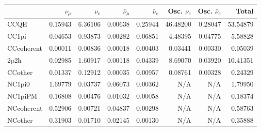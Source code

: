 

\begin{table}
	\centering
	\begin{tabular} { | l ||r | r | r | r | r | r | | r | }
	\hline
	              & $\nu_\mu$            & $\nu_e$              & $\bar{\nu}_{\mu}$    & $\bar{\nu}_{e}$      & Osc. $\nu_e$         & Osc. $\bar{\nu}_{e}$ & Total                \\ \hline\hline
	 CCQE         & 0.15943              & 6.36106              & 0.00638              & 0.25944              & 46.48200             & 0.28047              & 53.54879             \\ \hline
	 CC1pi        & 0.04653              & 0.93873              & 0.00282              & 0.06851              & 4.48395              & 0.04775              & 5.58828              \\ \hline
	 CCcoherent   & 0.00011              & 0.00836              & 0.00018              & 0.00403              & 0.03441              & 0.00330              & 0.05039              \\ \hline
	 2p2h         & 0.02985              & 1.60917              & 0.00118              & 0.04339              & 8.69070              & 0.03920              & 10.41351             \\ \hline
	 CCother      & 0.01337              & 0.12912              & 0.00035              & 0.00957              & 0.08761              & 0.00328              & 0.24329              \\ \hline
	 NC1pi0       & 1.69779              & 0.03737              & 0.06073              & 0.00362              & N/A                  & N/A                  & 1.79950              \\ \hline
	 NC1piPM      & 0.16808              & 0.00476              & 0.01032              & 0.00058              & N/A                  & N/A                  & 0.18374              \\ \hline
	 NCcoherent   & 0.52906              & 0.00721              & 0.04837              & 0.00298              & N/A                  & N/A                  & 0.58763              \\ \hline
	 NCother      & 0.31903              & 0.01710              & 0.02145              & 0.00130              & N/A                  & N/A                  & 0.35888              \\ \hline

\end{tabular}
\end{table}
